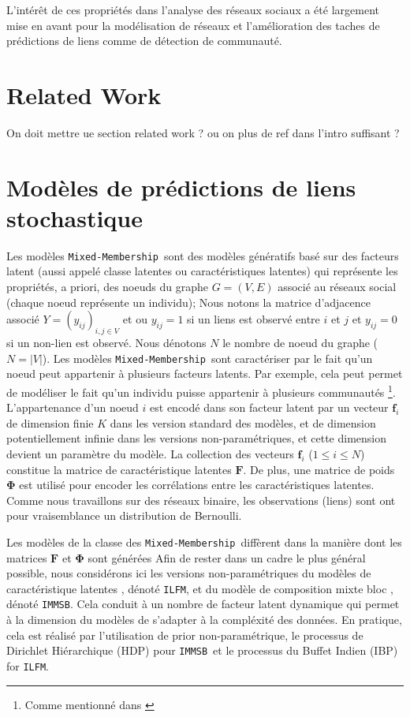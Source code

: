 \documentclass[french]{hermes-journal}
\newcommand{\ilfm}{\texttt{ILFM}}
\newcommand{\immsb}{\texttt{IMMSB}}
\newcommand{\mmm}{\texttt{Mixed-Membership}~}
\newcommand{\mat}[1]{\bm{#1}}
\begin{document}
L'intérêt de ces propriétés dans l'analyse des réseaux sociaux a été largement mise en avant pour la modélisation de réseaux et l'amélioration des taches de prédictions de liens comme de détection de communauté.


\section{Related Work}

On doit mettre ue section related work ? ou on plus de ref dans l'intro suffisant ?

\section{Modèles de prédictions de liens stochastique}

Les modèles \mmm sont des modèles génératifs basé sur des facteurs latent (aussi appelé classe latentes ou caractéristiques latentes) qui représente les propriétés, a priori, des noeuds du graphe $G=(V,E)$ associé au réseaux social (chaque noeud représente un individu); Nous notons la matrice d'adjacence associé $Y=(y_{ij})_{i,j\in V}$ et ou $y_{ij}=1$ si un liens est observé entre $i$ et $j$ et $y_{ij}=0$ si un non-lien est observé. Nous dénotons $N$ le nombre de noeud du graphe ($N=|V|$). Les modèles \mmm sont caractériser par le fait qu'un noeud peut appartenir à plusieurs facteurs latents. Par exemple, cela peut permet de modéliser le fait qu'un individu puisse appartenir à plusieurs communautés \footnote{Comme mentionné dans \cite{goldenberg2010survey} }. L'appartenance d'un noeud $i$ est encodé dans son facteur latent par un vecteur $\mat{f}_i$ de dimension finie $K$ dans les version standard des modèles, et de dimension potentiellement infinie dans les versions non-paramétriques, et cette dimension devient un paramètre du modèle. La collection des vecteurs $\mat{f}_{i}$ ($1 \le i \le N$) constitue la matrice de caractéristique latentes $\mat{F}$. De plus, une matrice de poids $\mat{\Phi}$ est utilisé pour encoder les corrélations entre les caractéristiques latentes. Comme nous travaillons sur des réseaux binaire, les observations (liens) sont ont pour vraisemblance un distribution de Bernoulli.

Les modèles de la classe des \mmm diffèrent dans la manière dont les matrices $\mat{F}$ et $\mat{\Phi}$ sont générées Afin de rester dans un cadre le plus général possible, nous considérons ici les versions non-paramétriques du modèles de caractéristique latentes \cite{ILFRM}, dénoté \ilfm, et du modèle de composition mixte bloc  \cite{iMMSB,fan2015dynamic}, dénoté \immsb. Cela conduit à un nombre de facteur latent dynamique qui permet à la dimension du modèles de s'adapter à la compléxité des données. En pratique, cela est réalisé par l'utilisation de prior non-paramétrique, le processus de Dirichlet Hiérarchique (HDP) pour \immsb\ et le processus du Buffet Indien (IBP) for \ilfm.~\\
\end{document}

